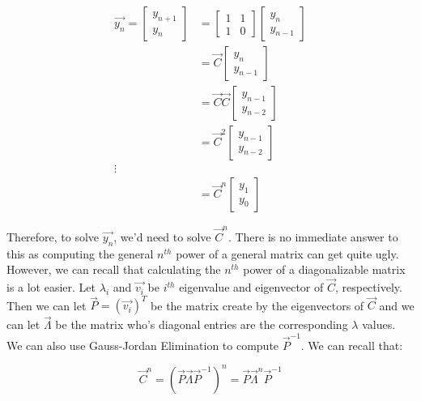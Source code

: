 \documentclass{article}
\begin{document}
\begin{align*} 
\vec{y_{n}}
=
\begin{bmatrix}
y_{n+1} \\
y_{n} 
\end{bmatrix}
&=
\begin{bmatrix}
1 & 1 \\
1 & 0 
\end{bmatrix}
\begin{bmatrix}
y_{n} \\
y_{n-1}
\end{bmatrix} \\
&=
\vec{C}
\begin{bmatrix}
y_{n} \\
y_{n-1} 
\end{bmatrix} \\
&=  
\vec{C}\vec{C}
\begin{bmatrix}
y_{n-1} \\
y_{n-2} 
\end{bmatrix} \\ 
&=  
\vec{C}^{2}
\begin{bmatrix}
y_{n-1} \\
y_{n-2} 
\end{bmatrix} \\ 
\vdots\\
&=  
\vec{C}^{n}
\begin{bmatrix}
y_{1} \\
y_{0} 
\end{bmatrix}
\end{align*}

Therefore, to solve $\vec{y_{n}}$, we'd need to solve $\vec{C}^{n}$. There is 
no immediate answer to this as computing the general $n^{th}$ power of a 
general matrix can get quite ugly. However, we can recall that calculating the 
$n^{th}$ power of a diagonalizable matrix is a lot easier. Let $\lambda_{i}$ 
and $\vec{v_i}$ be $i^{th}$ eigenvalue and eigenvector of $\vec{C}$, 
respectively. Then we can let $\vec{P}=(\vec{v_i})^{T}$ be the matrix create 
by the eigenvectors of $\vec{C}$ and we can let $\vec{\Lambda}$ be the matrix 
who's diagonal entries are the corresponding $\lambda$ values. 
We can also use Gauss-Jordan Elimination to compute $\vec{P}^{-1}$. We can 
recall that:

\begin{equation}
\vec{C}^{n}
=
\left(\vec{P}\vec{\Lambda}\vec{P}^{-1}\right)^{n}
=
\vec{P}\vec{\Lambda}^{n}\vec{P}^{-1}
\end{equation}
\end{document}
